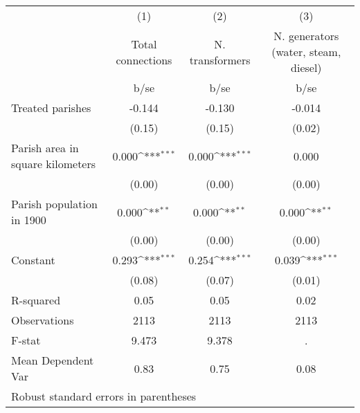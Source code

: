 {
\def\sym#1{\ifmmode^{#1}\else\(^{#1}\)\fi}
\begin{tabular}{l*{3}{c}}
\hline\hline
                    &\multicolumn{1}{c}{(1)}         &\multicolumn{1}{c}{(2)}         &\multicolumn{1}{c}{(3)}         \\
                    &Total connections         &N. transformers         &N. generators (water, steam, diesel)         \\
                    &        b/se         &        b/se         &        b/se         \\
\hline
Treated parishes    &      -0.144         &      -0.130         &      -0.014         \\
                    &      (0.15)         &      (0.15)         &      (0.02)         \\
Parish area in square kilometers&       0.000\sym{***}&       0.000\sym{***}&       0.000         \\
                    &      (0.00)         &      (0.00)         &      (0.00)         \\
Parish population in 1900&       0.000\sym{**} &       0.000\sym{**} &       0.000\sym{**} \\
                    &      (0.00)         &      (0.00)         &      (0.00)         \\
Constant            &       0.293\sym{***}&       0.254\sym{***}&       0.039\sym{***}\\
                    &      (0.08)         &      (0.07)         &      (0.01)         \\
\hline
R-squared           &        0.05         &        0.05         &        0.02         \\
Observations        &        2113         &        2113         &        2113         \\
F-stat              &       9.473         &       9.378         &           .         \\
Mean Dependent Var  &        0.83         &        0.75         &        0.08         \\
\hline\hline
\multicolumn{4}{l}{\footnotesize Robust standard errors in parentheses}\\
\end{tabular}
}
